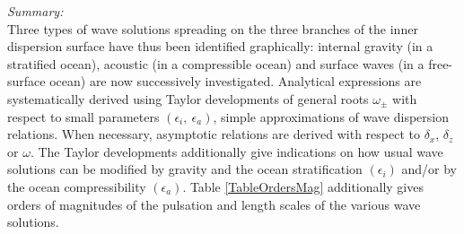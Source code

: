 \documentclass[a4paper,11pt]{article}
\begin{document}
\textit{Summary:}\\
Three types of wave solutions spreading on the three branches of the inner dispersion surface have thus been identified graphically: internal gravity (in a stratified ocean), acoustic (in a compressible ocean) and surface waves (in a free-surface ocean) are now successively investigated. Analytical expressions are systematically derived using Taylor developments of general roots $\omega_{\pm}$ with respect to small parameters $(\epsilon_i,\ \epsilon_a)$, simple approximations of wave dispersion relations. When necessary, asymptotic relations are derived with respect to $\delta_x$, $\delta_z$ or $\omega$. The Taylor developments additionally give indications on how usual wave solutions can be modified by gravity and the ocean stratification $(\epsilon_i)$ and/or by the ocean compressibility $(\epsilon_a)$. Table \ref{TableOrdersMag} additionally gives orders of magnitudes of the pulsation and length scales of the various wave solutions.

%	
%	
\end{document}
